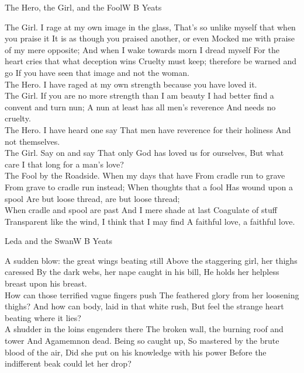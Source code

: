  

\begin{poem}{The Hero, the Girl, and the Fool}{W B Yeats}

The Girl. I rage at my own image in the glass,
That's so unlike myself that when you praise it
It is as though you praised another, or even
Mocked me with praise of my mere opposite;
And when I wake towards morn I dread myself
For the heart cries that what deception wins
Cruelty must keep; therefore be warned and go
If you have seen that image and not the woman.\\

The Hero. I have raged at my own strength because you have loved it.\\

The Girl. If you are no more strength than I am beauty
I had better find a convent and turn nun;
A nun at least has all men's reverence
And needs no cruelty.\\

The Hero.                  I have heard one say
That men have reverence for their holiness
And not themselves.\\

The Girl.                    Say on and say
That only God has loved us for ourselves,
But what care I that long for a man's love?\\

The Fool by the Roadside. When my days that have
From cradle run to grave
From grave to cradle run instead;
When thoughts that a fool
Has wound upon a spool
Are but loose thread, are but loose thread;\\

When cradle and spool are past
And I mere shade at last
Coagulate of stuff
Transparent like the wind,
I think that I may find
A faithful love, a faithful love.\\
\end{poem}

 

\begin{poem}{Leda and the Swan}{W B Yeats}

A sudden blow: the great wings beating still
Above the staggering girl, her thighs caressed
By the dark webs, her nape caught in his bill,
He holds her helpless breast upon his breast.\\

How can those terrified vague fingers push
The feathered glory from her loosening thighs?
And how can body, laid in that white rush,
But feel the strange heart beating where it lies?\\

A shudder in the loins engenders there
The broken wall, the burning roof and tower
And Agamemnon dead.
                               Being so caught up,
So mastered by the brute blood of the air,
Did she put on his knowledge with his power
Before the indifferent beak could let her drop?\\
\end{poem}

